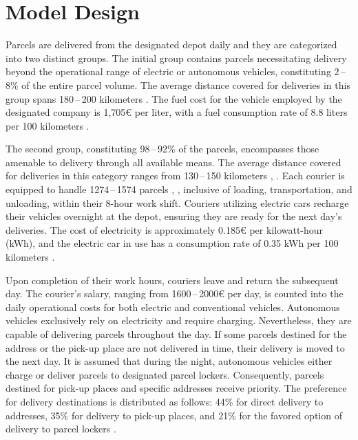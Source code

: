 \documentclass[a4paper, 11pt, a4paper]{article}
\begin{document}
\section{Model Design}

Parcels are delivered from the designated depot daily and they are categorized into two distinct groups. The initial group contains parcels
necessitating delivery beyond the operational range of electric or autonomous vehicles, constituting 2\,--\,8\% \cite{packeta} of the entire parcel volume.
The average distance covered for deliveries in this group spans 180\,--\,200 kilometers \cite{packeta}. The fuel cost for the vehicle employed by the designated
company is 1,705€ per liter, with a fuel consumption rate of 8.8 liters per 100 kilometers \cite{peugeot}.

The second group, constituting 98\,--\,92\% \cite{packeta} of the parcels, encompasses those amenable to delivery through all available means. The average distance
covered for deliveries in this category ranges from 130\,--\,150 kilometers \cite{packeta}, \cite{delivery.distance}. Each courier is equipped to handle 1274\,--\,1574 parcels \cite{parcels.num}, \cite{delivery.percentage}, inclusive of loading,
transportation, and unloading, within their 8-hour work shift. Couriers utilizing electric cars recharge their vehicles overnight at the depot, ensuring
they are ready for the next day's deliveries. The cost of electricity is approximately 0.185€ per kilowatt-hour (kWh), and the electric car in use has a
consumption rate of 0.35 kWh per 100 kilometers \cite{peugeot}.

Upon completion of their work hours, couriers leave and return the subsequent day. The courier's salary, ranging from 1600\,--\,2000€ per day, is counted into
the daily operational costs for both electric and conventional vehicles. Autonomous vehicles exclusively rely on electricity and require charging.
Nevertheless, they are capable of delivering parcels throughout the day. If some parcels destined for the address or the pick-up place are not delivered in time, their delivery is moved to the next day.
It is assumed that during the night, autonomous vehicles either
charge or deliver parcels to designated parcel lockers. Consequently, parcels destined for pick-up places and specific addresses receive priority.
The preference for delivery destinations is distributed as follows: 44\% for direct delivery to addresses, 35\% for delivery to pick-up places,
and 21\% for the favored option of delivery to parcel lockers \cite{delivery.percentage}.
\end{document}
